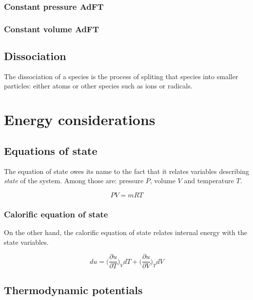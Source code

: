 \documentclass[10pt,twocolumn]{article}
\begin{document}
\subsubsection{Constant pressure AdFT}



\subsubsection{Constant volume AdFT}







\subsection{Dissociation}

The dissociation of a species is the process of spliting that species into smaller particles: either atoms or other species such as ions or radicals.

\section{Energy considerations}

\subsection{Equations of state}

The equation of state owes its name to the fact that it relates variables describing \textit{state} of the system. Among those are: pressure $P$, volume $V$ and temperature $T$.

\begin{equation}
PV = mRT
\end{equation}

\subsubsection{Calorific equation of state}

On the other hand, the calorific equation of state relates internal energy with the state variables.

\begin{equation}
du = \Big( \frac{\partial u}{\partial T} \Big)_V dT + \Big( \frac{\partial u}{\partial V} \Big)_T dV
\end{equation}

\subsection{Thermodynamic potentials}
\end{document}
